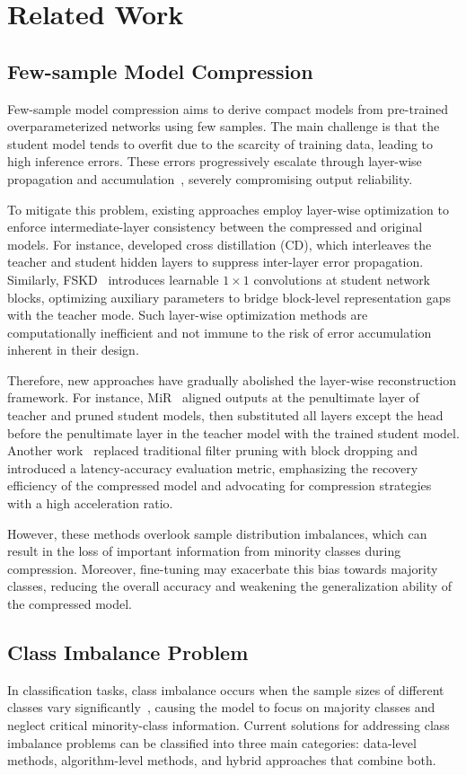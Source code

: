 \section{Related Work}
\subsection{Few-sample Model Compression}
Few-sample model compression aims to derive compact models from pre-trained overparameterized networks using few samples. The main challenge is that the student model tends to overfit due to the scarcity of training data, leading to high inference errors. These errors progressively escalate through layer-wise propagation and accumulation~\citep{dong2017learning}, severely compromising output reliability.


To mitigate this problem, existing approaches employ layer-wise optimization to enforce intermediate-layer consistency between the compressed and original models. For instance, \citet{bai2020few} developed cross distillation (CD), which interleaves the teacher and student hidden layers to suppress inter-layer error propagation. Similarly, FSKD~\citep{li2020few} introduces learnable 
$1 \times 1$ convolutions at student network blocks, optimizing auxiliary parameters to bridge block-level representation gaps with the teacher mode. Such layer-wise optimization methods are computationally inefficient and not immune to the risk of error accumulation inherent in their design. 

Therefore, new approaches have gradually abolished the layer-wise reconstruction framework. For instance, MiR~\citep{wang2022mir} aligned outputs at the penultimate layer of teacher and pruned student models, then substituted all layers except the head before the penultimate layer in the teacher model with the trained student model. Another work~\citep{wang2023practical} replaced traditional filter pruning with block dropping and introduced a latency-accuracy evaluation metric, emphasizing the recovery efficiency of the compressed model and advocating for compression strategies with a high acceleration ratio. 

However, these methods overlook sample distribution imbalances, which can result in the loss of important information from minority classes during compression. Moreover, fine-tuning may exacerbate this bias towards majority classes, reducing the overall accuracy and weakening the generalization ability of the compressed model.


\subsection{Class Imbalance Problem}
In classification tasks, class imbalance occurs when the sample sizes of different classes vary significantly~\citep{ochal2023few}, causing the model to focus on majority classes and neglect critical minority-class information. Current solutions for addressing class imbalance problems can be classified into three main categories: data-level methods, algorithm-level methods, and hybrid approaches that combine both.

